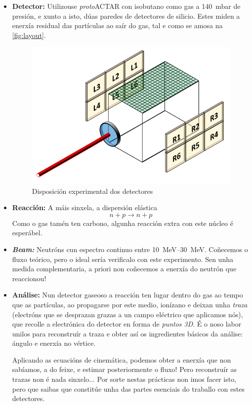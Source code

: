 \documentclass[11pt, a4paper]{article}
\begin{document}
\begin{itemize}
    \item \textbf{Detector:} Utilizouse \textit{proto}ACTAR con isobutano como gas a \qty{140}{\milli\bar} de presión, e xunto a isto, dúas paredes de detectores de silicio. Estes miden a enerxía residual das partículas ao saír do gas, tal e como se amosa na \autoref{fig:layout}.

          \begin{figure}[!ht]
              \centering
              \includegraphics[width=0.5\linewidth]{figures/SiliconLayout.png}
              \caption{Disposición experimental dos detectores}
              \label{fig:layout}
          \end{figure}
    \item \textbf{Reacción:} A máis sinxela, a dispersión elástica
          \begin{equation*}
              n + p \longrightarrow n + p
          \end{equation*}
          Como o gas tamén ten carbono, algunha reacción extra con este núcleo é esperábel.

    \item \textbf{\textit{Beam:}} Neutróns cun espectro continuo entre \qtyrange{10}{30}{\MeV}. Coñecemos o fluxo teórico, pero o ideal sería verificalo con este experimento. Sen unha medida complementaria, a priori non coñecemos a enerxía do neutrón que reaccionou!

    \item \textbf{Análise:} Nun detector gaseoso a reacción ten lugar dentro do gas ao tempo que as partículas, ao propagarse por este medio, ionízano e deixan unha \textit{traza} (electróns que se desprazan grazas a un campo eléctrico que aplicamos nós), que recolle a electrónica do detector en forma de \textit{puntos 3D}. É o noso labor unilos para reconstruír a traza e obter así os ingredientes básicos da análise: ángulo e enerxía no vértice.

          Aplicando as ecuacións de cinemática, podemos obter a enerxía que non sabíamos, a do feixe, e estimar posteriormente o fluxo! Pero reconstruír as trazas non é nada sinxelo... Por sorte nestas prácticas non imos facer isto, pero que saibas que constitúe unha das partes esenciais do traballo con estes detectores.


\end{itemize}
\end{document}
